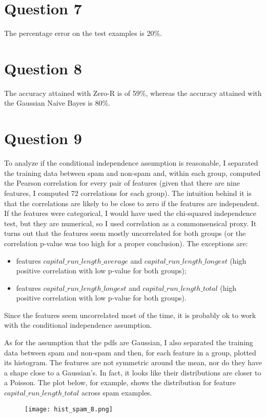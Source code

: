 \documentclass[leqno]{article}
\begin{document}

\section*{Question 7} The percentage error on the test examples is 20\%.


\section*{Question 8} The accuracy attained with Zero-R is of 59\%, whereas the accuracy attained with the Gaussian Naive Bayes is 80\%.

\section*{Question 9} To analyze if the conditional independence assumption is reasonable, I separated the training data between spam and non-spam and, within
each group, computed the Pearson correlation for every pair of features (given that there are nine features, I computed 72 correlations for each group). The intuition behind it is that the correlations are likely to be close to zero if the features are independent. If the features were categorical, I would have used the chi-squared independence test, but they are numerical, so I used correlation as a commonsensical proxy. It turns out that the features seem mostly uncorrelated for both groups (or the correlation p-value was too high for a proper conclusion). The exceptions are:
\begin{itemize}
\item features $capital\_run\_length\_average$ and $capital\_run\_length\_longest$ (high positive correlation with low p-value for both groups);
\item features $capital\_run\_length\_longest$ and $capital\_run\_length\_total$ (high positive correlation with low p-value for both groups).  
\end{itemize}  
Since the features seem uncorrelated most of the time, it is probably ok to work with the conditional independence assumption.

As for the assumption that the pdfs are Gaussian, I also separated the training data between spam and non-spam and then, for each feature in a group, plotted
its histogram. The features are not symmetric around the mean, nor do they have a shape close to a Gaussian's. In fact, it looks like their distributions are closer
to a Poisson. The plot below, for example, shows the distribution for feature $capital\_run\_length\_total$ across spam examples.


\begin{figure}[h!]
\centering
\texttt{[image: hist\_spam\_8.png]}
\end{figure}
\end{document}
